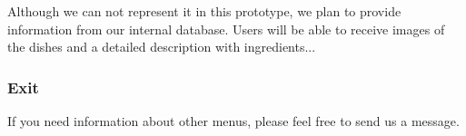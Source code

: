 Although we can not represent it in this prototype, we plan to provide information from our internal database. Users will be able to receive images of the dishes and a detailed description with ingredients...

\subsubsection{Exit}
If you need information about other menus, please feel free to send us a message. \newline \newline
